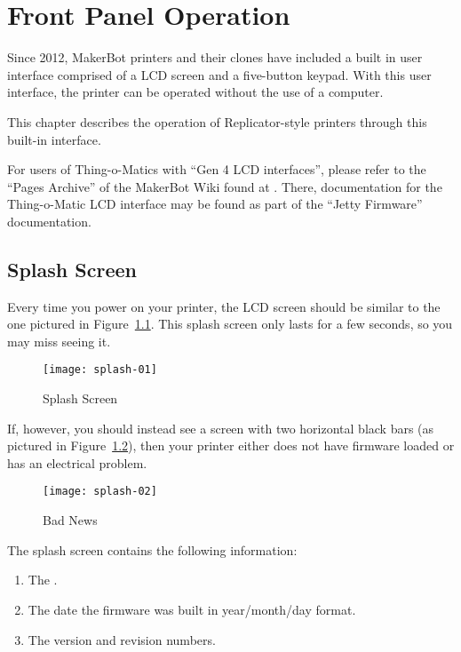 
\chapter{Front Panel Operation}\label{chap:whatever}

Since 2012, MakerBot printers and their clones have included a built in user
interface comprised of a \gls{LCD} screen and a five-button keypad.  With this
user interface, the printer can be operated without the use of a computer.

This chapter describes the operation of Replicator-style printers through this
built-in interface.

\ifdefined\luluflag
\else
For users of Thing-o-Matics with ``Gen 4 LCD interfaces'', please refer
to the ``Pages Archive'' of the MakerBot Wiki found at
.  There, documentation for the Thing-o-Matic
LCD interface may be found as part of the ``\gls{Jetty Firmware}''
documentation.
\fi


\section{Splash Screen}\label{sec:Splash}

Every time you power on your printer, the \gls{LCD} screen should be similar to the one pictured in Figure~\ref{fig:splash}.  This splash screen only lasts for a few seconds, so you may miss seeing it.

\begin{figure}[!htbp]
  \centering
    \texttt{[image: splash-01]}
    \caption{Splash Screen}
  \label{fig:splash}
\end{figure}

If, however, you should instead see a screen with two horizontal black bars (as pictured in Figure~\ref{fig:error}), then your printer either does not have \gls{firmware} loaded or has an electrical problem.

\begin{figure}[!htbp]
  \centering
    \texttt{[image: splash-02]}
    \caption{Bad News}
  \label{fig:error}
\end{figure}

The splash screen contains the following information:

\begin{enumerate}
\item The .
\item The date the firmware was built in year/month/day format.
\item The version and revision numbers.
\end{enumerate}

